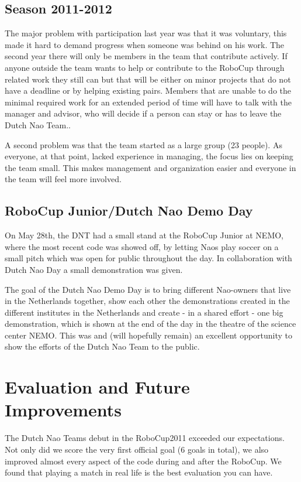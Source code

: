 \documentclass[11pt,a4paper,oneside]{article}
\begin{document}
\subsection{Season 2011-2012}
The major problem with participation last year was that it was voluntary, this made it hard to demand progress when someone was behind on his work. The second year there will only be members in the team that contribute actively. If anyone outside the team wants to help or contribute to the RoboCup through related work they still can but that will be either on minor projects that do not have a deadline or by helping existing pairs. Members that are unable to do the minimal required work for an extended period of time will have to talk with the manager and advisor, who will decide if a person can stay or has to leave the Dutch Nao Team..

A second problem was that the team started as a large group (23 people). As everyone, at that point, lacked experience in managing, the focus lies on keeping the team small. This makes management and organization easier and everyone in the team will feel more involved.  

\subsection{RoboCup Junior/Dutch Nao Demo Day}
On May 28th, the DNT had a small stand at the RoboCup Junior at NEMO, where the most recent code was showed off, by letting Naos play soccer on a small pitch which was open for public throughout the day. In collaboration with Dutch Nao Day a small demonstration was given.
 
The goal of the Dutch Nao Demo Day is to bring different Nao-owners that live in the Netherlands together, show each other the demonstrations created in the different institutes in the Netherlands and create - in a shared effort - one big demonstration, which is shown at the end of the day in the theatre of the science center NEMO. This was and (will hopefully remain) an excellent opportunity to show the efforts of the Dutch Nao Team to the public. 

\section{Evaluation and Future Improvements}
The Dutch Nao Teams debut in the RoboCup2011 exceeded our expectations. Not only did we score the very first official goal (6 goals in total), we also improved almost every aspect of the code during and after the RoboCup. We found that playing a match in real life is the best evaluation you can have. 
\end{document}
